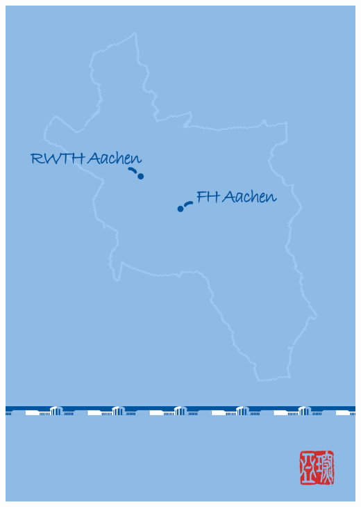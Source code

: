 \documentclass[a4paper,10pt,oneside]{scrbook}
\begin{document}
\begin{titlepage}
\parindent=0pt
\includegraphics[width=\linewidth]{Bilder/Back_Cover_.jpg}
\end{titlepage}
\end{document}
